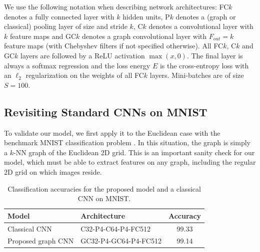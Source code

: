 \documentclass{article}
\newcommand{\todo}[1]{{\color{red} #1 }}
\begin{document}
We use the following notation when describing network architectures: FC$k$
denotes a fully connected layer with $k$ hidden units, P$k$ denotes a (graph or
classical) pooling layer of size and stride $k$, C$k$ denotes a convolutional
layer with $k$ feature maps and GC$k$ denotes a graph convolutional layer with
$F_{out} = k$ feature maps (with Chebyshev filters if not specified otherwise).
All FC$k$, C$k$ and GC$k$ layers are followed by a ReLU activation $\max(x,0)$.
The final layer is always a softmax regression and the loss energy $E$ is the
cross-entropy loss with an $\ell_2$ regularization on the weights of all
FC$k$ layers. Mini-batches are of size $S = 100$.  %













\subsection{Revisiting Standard CNNs on MNIST} \label{sec:MNIST}

To validate our model, we first apply it to the Euclidean case with the benchmark MNIST classification
problem \cite{pro:LeCunBottouBengioHaffner98MNIST}. In this situation, the graph is simply a $k$-NN graph of the Euclidean 2D grid. This is an important sanity check for our model, which must be able to extract
features on any graph, including the regular 2D grid on which images reside.


\begin{table}[h!]
\centering
\begin{tabular}{llc}
\toprule
Model & Architecture & Accuracy \\
\midrule
Classical CNN & C32-P4-C64-P4-FC512 & 99.33  \\
Proposed graph CNN & GC32-P4-GC64-P4-FC512 & 99.14  \\
\bottomrule
\end{tabular}
\caption{Classification accuracies for the proposed model and a classical CNN on
MNIST.} 
\label{tab:mnist}
\end{table}
\end{document}
